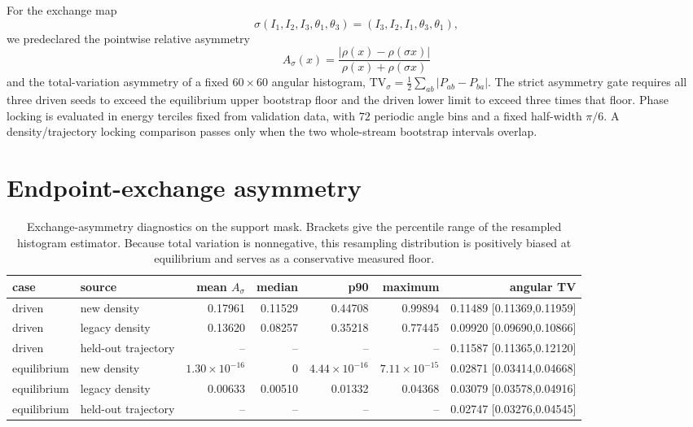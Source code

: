 \documentclass[10pt]{article}
\begin{document}
For the exchange map
\[
 \sigma(I_1,I_2,I_3,\theta_1,\theta_3)
 =(I_3,I_2,I_1,\theta_3,\theta_1),
\]
we predeclared the pointwise relative asymmetry
\[
 A_\sigma(x)=\frac{|\rho(x)-\rho(\sigma x)|}
 {\rho(x)+\rho(\sigma x)}
\]
and the total-variation asymmetry of a fixed $60\times60$ angular histogram,
$\mathrm{TV}_\sigma=\tfrac12\sum_{ab}|P_{ab}-P_{ba}|$.  The strict
asymmetry gate requires all three driven seeds to exceed the equilibrium
upper bootstrap floor and the driven lower limit to exceed three times that
floor.  Phase locking is evaluated in energy terciles fixed from validation
data, with $72$ periodic angle bins and a fixed half-width $\pi/6$.  A
density/trajectory locking comparison passes only when the two whole-stream
bootstrap intervals overlap.

\section{Endpoint-exchange asymmetry}

\begin{table}[ht]
\centering
\caption{Exchange-asymmetry diagnostics on the support mask.  Brackets give
the percentile range of the resampled histogram estimator.  Because total
variation is nonnegative, this resampling distribution is positively biased
at equilibrium and serves as a conservative measured floor.}
\label{tab:asymmetry}
\small
\begin{tabular}{llrrrrr}
\toprule
case & source & mean $A_\sigma$ & median & p90 & maximum & angular TV \\
\midrule
driven & new density & 0.17961 & 0.11529 & 0.44708 & 0.99894 & 0.11489 [0.11369,0.11959] \\
driven & legacy density & 0.13620 & 0.08257 & 0.35218 & 0.77445 & 0.09920 [0.09690,0.10866] \\
driven & held-out trajectory & -- & -- & -- & -- & 0.11587 [0.11365,0.12120] \\
\addlinespace
equilibrium & new density & $1.30\!\times\!10^{-16}$ & 0 & $4.44\!\times\!10^{-16}$ & $7.11\!\times\!10^{-15}$ & 0.02871 [0.03414,0.04668] \\
equilibrium & legacy density & 0.00633 & 0.00510 & 0.01332 & 0.04368 & 0.03079 [0.03578,0.04916] \\
equilibrium & held-out trajectory & -- & -- & -- & -- & 0.02747 [0.03276,0.04545] \\
\bottomrule
\end{tabular}
\end{table}
\end{document}

